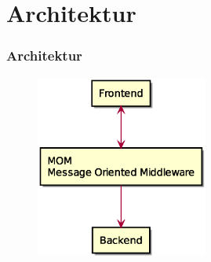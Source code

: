 \section{Architektur}
\begin{frame}
    \frametitle{Architektur}
    \begin{figure}
        \centering
        \includegraphics[height=6cm]{media/SchichtenArchitektur.eps}
    \end{figure}
\end{frame}
